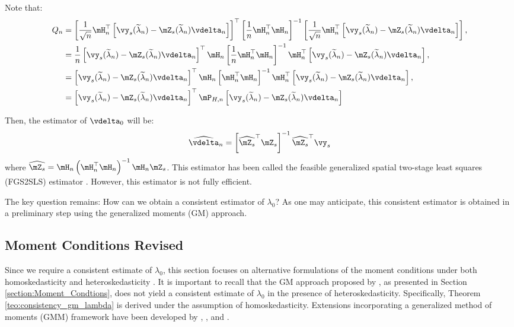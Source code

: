 \documentclass[english,12pt]{book}\usepackage[]{graphicx}\usepackage[]{xcolor}
\begin{document}
Note that:
\begin{equation*}
  \begin{aligned}
 Q_n & = \left[\frac{1}{\sqrt{n}}\mH^\top_n\left[\vy_s(\widetilde{\lambda}_n) - \mZ_s(\widetilde{\lambda}_n)\vdelta_n\right]\right]^\top \left[\frac{1}{n}\mH^\top_n\mH_n\right]^{-1}\left[\frac{1}{\sqrt{n}}\mH^\top_n\left[\vy_s(\widetilde{\lambda}_n) - \mZ_s(\widetilde{\lambda}_n)\vdelta_n\right]\right], \\
     & = \frac{1}{n}\left[\vy_s(\widetilde{\lambda}_n) - \mZ_s(\widetilde{\lambda}_n)\vdelta_n\right]^\top \mH_n\left[\frac{1}{n}\mH_n^\top\mH_n\right]^{-1}\mH_n^\top \left[\vy_s(\widetilde{\lambda}_n) - \mZ_s(\widetilde{\lambda}_n)\vdelta_n\right], \\
     & = \left[\vy_s(\widetilde{\lambda}_n) - \mZ_s(\widetilde{\lambda}_n)\vdelta_n\right]^\top \mH_n\left[\mH_n^\top\mH_n\right]^{-1}\mH_n^\top \left[\vy_s(\widetilde{\lambda}_n) - \mZ_s(\widetilde{\lambda}_n)\vdelta_n\right], \\
     & = \left[\vy_s(\widetilde{\lambda}_n) - \mZ_s(\widetilde{\lambda}_n)\vdelta_n\right]^\top \mP_{H,n} \left[\vy_s(\widetilde{\lambda}_n) - \mZ_s(\widetilde{\lambda}_n)\vdelta_n\right]
\end{aligned}
\end{equation*}

Then, the estimator of $\vdelta_0$ will be:
\begin{equation*}
  \widehat{\vdelta}_n = \left[\widehat{\mZ_s}^\top\mZ_s\right]^{-1}\widehat{\mZ_s}^\top\vy_s
\end{equation*}
%
where $\widehat{\mZ_s} = \mH_n\left(\mH_n^\top\mH_n\right)^{-1}\mH_n\mZ_s$. This estimator has been called the feasible generalized spatial two-stage least squares (FGS2SLS) estimator \citep{kelejian1998generalized}. However, this estimator is not fully efficient. 

The key question remains: How can we obtain a consistent estimator of $\lambda_0$? As one may anticipate, this consistent estimator is obtained in a preliminary step using the generalized moments (GM) approach.

\subsection{Moment Conditions Revised}

Since we require a consistent estimate of $\lambda_0$, this section focuses on alternative formulations of the moment conditions under both homoskedasticity \citep{kelejian1999generalized} and heteroskedasticity \citep{kelejian2010specification}. It is important to recall that the GM approach proposed by \cite{kelejian1999generalized}, as presented in Section \ref{section:Moment_Condtions}, does not yield a consistent estimate of $\lambda_0$ in the presence of heteroskedasticity. Specifically, Theorem \ref{teo:consistency_gm_lambda} is derived under the assumption of homoskedasticity. Extensions incorporating a generalized method of moments (GMM) framework have been developed by \cite{kelejian2010specification}, \cite{arraiz2010spatial}, and \cite{drukker2013two}.
\end{document}
